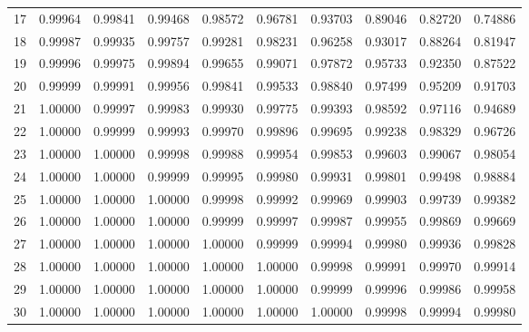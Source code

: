 \begin{tabular}{r|*{9}{c}}
 17 & 0.99964 & 0.99841 & 0.99468 & 0.98572 & 0.96781 & 0.93703 & 0.89046 & 0.82720 & 0.74886 \\
 18 & 0.99987 & 0.99935 & 0.99757 & 0.99281 & 0.98231 & 0.96258 & 0.93017 & 0.88264 & 0.81947 \\
 19 & 0.99996 & 0.99975 & 0.99894 & 0.99655 & 0.99071 & 0.97872 & 0.95733 & 0.92350 & 0.87522 \\
 20 & 0.99999 & 0.99991 & 0.99956 & 0.99841 & 0.99533 & 0.98840 & 0.97499 & 0.95209 & 0.91703 \\
 21 & 1.00000 & 0.99997 & 0.99983 & 0.99930 & 0.99775 & 0.99393 & 0.98592 & 0.97116 & 0.94689 \\
 22 & 1.00000 & 0.99999 & 0.99993 & 0.99970 & 0.99896 & 0.99695 & 0.99238 & 0.98329 & 0.96726 \\
 23 & 1.00000 & 1.00000 & 0.99998 & 0.99988 & 0.99954 & 0.99853 & 0.99603 & 0.99067 & 0.98054 \\
 24 & 1.00000 & 1.00000 & 0.99999 & 0.99995 & 0.99980 & 0.99931 & 0.99801 & 0.99498 & 0.98884 \\
 25 & 1.00000 & 1.00000 & 1.00000 & 0.99998 & 0.99992 & 0.99969 & 0.99903 & 0.99739 & 0.99382 \\
 26 & 1.00000 & 1.00000 & 1.00000 & 0.99999 & 0.99997 & 0.99987 & 0.99955 & 0.99869 & 0.99669 \\
 27 & 1.00000 & 1.00000 & 1.00000 & 1.00000 & 0.99999 & 0.99994 & 0.99980 & 0.99936 & 0.99828 \\
 28 & 1.00000 & 1.00000 & 1.00000 & 1.00000 & 1.00000 & 0.99998 & 0.99991 & 0.99970 & 0.99914 \\
 29 & 1.00000 & 1.00000 & 1.00000 & 1.00000 & 1.00000 & 0.99999 & 0.99996 & 0.99986 & 0.99958 \\
 30 & 1.00000 & 1.00000 & 1.00000 & 1.00000 & 1.00000 & 1.00000 & 0.99998 & 0.99994 & 0.99980 \\
\end{tabular}

\myskip

